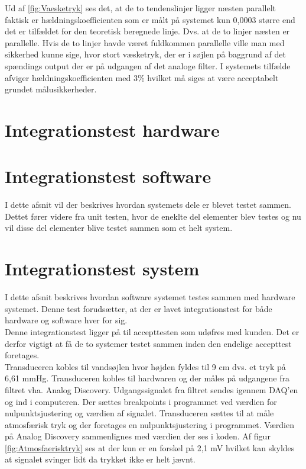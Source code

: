 Ud af \ref{fig:Vaesketryk} ses det, at de to tendenslinjer ligger næsten parallelt faktisk er hældningskoefficienten som er målt på systemet kun 0,0003 større end det er tilfældet for den teoretisk beregnede linje. Dvs. at de to linjer næsten er parallelle. Hvis de to linjer havde været fuldkommen parallelle ville man med sikkerhed kunne sige, hvor stort væsketryk, der er i søjlen på baggrund af det spændings output der er på udgangen af det analoge filter. I systemets tilfælde afviger hældningskoefficienten med 3\% hvilket må siges at være acceptabelt grundet målusikkerheder.


\section{Integrationstest hardware}


\section{Integrationstest software}
I dette afsnit vil der beskrives hvordan systemets dele er blevet testet sammen. Dettet fører videre fra unit testen, hvor de eneklte del elementer blev testes og nu vil disse del elementer blive testet sammen som et helt system. 

\section{Integrationstest system}
I dette afsnit beskrives hvordan software systemet testes sammen med hardware systemet. Denne test forudsætter, at der er lavet integrationstest for både hardware og software hver for sig. \\
Denne integrationstest ligger på til accepttesten som udøfres med kunden. Det er derfor vigtigt at få de to systemer testet sammen inden den endelige accepttest foretages. 
\\
Transduceren kobles til vandsøjlen hvor højden fyldes til 9 cm dvs. et tryk på 6,61 mmHg. Transduceren kobles til hardwaren og der måles på udgangene fra filtret vha. Analog Discovery. Udgangssignalet fra filtret sendes igennem DAQ’en og ind i computeren. Der sættes breakpoints i programmet ved værdien for nulpunktsjustering og værdien af signalet. 
Transduceren sættes til at måle atmosfærisk tryk og der foretages en nulpunktsjustering i programmet. Værdien på Analog Discovery sammenlignes med værdien der ses i koden. Af figur \ref{fig:Atmosfaerisktryk} ses at der kun er en forskel på 2,1 mV hvilket kan skyldes at signalet svinger lidt da trykket ikke er helt jævnt.

